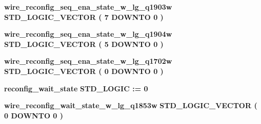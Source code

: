 \begin{DoxyCompactItemize}
\item 
{\bf wire\+\_\+reconfig\+\_\+seq\+\_\+ena\+\_\+state\+\_\+w\+\_\+lg\+\_\+q1903w} {\bfseries \textcolor{comment}{S\+T\+D\+\_\+\+L\+O\+G\+I\+C\+\_\+\+V\+E\+C\+T\+OR}\textcolor{vhdlchar}{ }\textcolor{vhdlchar}{(}\textcolor{vhdlchar}{ }\textcolor{vhdlchar}{ } \textcolor{vhdldigit}{7} \textcolor{vhdlchar}{ }\textcolor{keywordflow}{D\+O\+W\+N\+TO}\textcolor{vhdlchar}{ }\textcolor{vhdlchar}{ } \textcolor{vhdldigit}{0} \textcolor{vhdlchar}{ }\textcolor{vhdlchar}{)}\textcolor{vhdlchar}{ }} 
\item 
{\bf wire\+\_\+reconfig\+\_\+seq\+\_\+ena\+\_\+state\+\_\+w\+\_\+lg\+\_\+q1904w} {\bfseries \textcolor{comment}{S\+T\+D\+\_\+\+L\+O\+G\+I\+C\+\_\+\+V\+E\+C\+T\+OR}\textcolor{vhdlchar}{ }\textcolor{vhdlchar}{(}\textcolor{vhdlchar}{ }\textcolor{vhdlchar}{ } \textcolor{vhdldigit}{5} \textcolor{vhdlchar}{ }\textcolor{keywordflow}{D\+O\+W\+N\+TO}\textcolor{vhdlchar}{ }\textcolor{vhdlchar}{ } \textcolor{vhdldigit}{0} \textcolor{vhdlchar}{ }\textcolor{vhdlchar}{)}\textcolor{vhdlchar}{ }} 
\item 
{\bf wire\+\_\+reconfig\+\_\+seq\+\_\+ena\+\_\+state\+\_\+w\+\_\+lg\+\_\+q1702w} {\bfseries \textcolor{comment}{S\+T\+D\+\_\+\+L\+O\+G\+I\+C\+\_\+\+V\+E\+C\+T\+OR}\textcolor{vhdlchar}{ }\textcolor{vhdlchar}{(}\textcolor{vhdlchar}{ }\textcolor{vhdlchar}{ } \textcolor{vhdldigit}{0} \textcolor{vhdlchar}{ }\textcolor{keywordflow}{D\+O\+W\+N\+TO}\textcolor{vhdlchar}{ }\textcolor{vhdlchar}{ } \textcolor{vhdldigit}{0} \textcolor{vhdlchar}{ }\textcolor{vhdlchar}{)}\textcolor{vhdlchar}{ }} 
\item 
{\bf reconfig\+\_\+wait\+\_\+state} {\bfseries \textcolor{comment}{S\+T\+D\+\_\+\+L\+O\+G\+IC}\textcolor{vhdlchar}{ }\textcolor{vhdlchar}{ }\textcolor{vhdlchar}{\+:}\textcolor{vhdlchar}{=}\textcolor{vhdlchar}{ }\textcolor{vhdlchar}{ }\textcolor{vhdlchar}{\textquotesingle{}}\textcolor{vhdlchar}{ } \textcolor{vhdldigit}{0} \textcolor{vhdlchar}{ }\textcolor{vhdlchar}{\textquotesingle{}}\textcolor{vhdlchar}{ }} 
\item 
{\bf wire\+\_\+reconfig\+\_\+wait\+\_\+state\+\_\+w\+\_\+lg\+\_\+q1853w} {\bfseries \textcolor{comment}{S\+T\+D\+\_\+\+L\+O\+G\+I\+C\+\_\+\+V\+E\+C\+T\+OR}\textcolor{vhdlchar}{ }\textcolor{vhdlchar}{(}\textcolor{vhdlchar}{ }\textcolor{vhdlchar}{ } \textcolor{vhdldigit}{0} \textcolor{vhdlchar}{ }\textcolor{keywordflow}{D\+O\+W\+N\+TO}\textcolor{vhdlchar}{ }\textcolor{vhdlchar}{ } \textcolor{vhdldigit}{0} \textcolor{vhdlchar}{ }\textcolor{vhdlchar}{)}\textcolor{vhdlchar}{ }} 
\item 

\end{DoxyCompactItemize}
